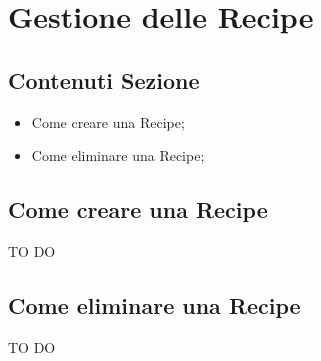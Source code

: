 %

\section{Gestione delle Recipe} %
\label{sec:gestione_delle_recipe}
	\subsection{Contenuti Sezione} %
	\label{sub:contenuti_sezione}
	\begin{itemize}
		\item Come creare una Recipe;
		\item Come eliminare una Recipe;
	\end{itemize}

	\subsection{Come creare una Recipe}
	\label{sub:creare_recipe}
	TO DO
	
	
	
	\subsection{Come eliminare una Recipe}
	\label{sub:eliminare_recipe}
	TO DO


